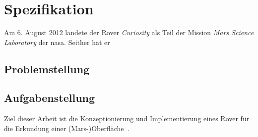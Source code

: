 \chapter{Spezifikation}
\label{chp:spezifikation}

Am 6. August 2012 landete der Rover \textit{Curiosity} als Teil der Mission \textit{Mars Science Laboratory} der \acf{nasa}. %
Seither hat er 

\section{Problemstellung}
\label{sec:problem}



\section{Aufgabenstellung}
\label{sec:aufgabe}

Ziel dieser Arbeit ist die \glqq Konzeptionierung und Implementierung eines Rover für die Erkundung einer (Mars-)Oberfläche\grqq\ \cite{mueller2019}.